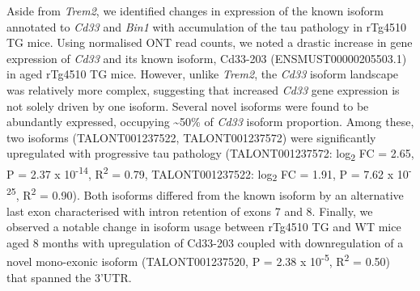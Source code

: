 Aside from \textit{Trem2}, we identified changes in expression of the known isoform annotated to \textit{Cd33} and \textit{Bin1} with accumulation of the tau pathology in rTg4510 TG mice. Using normalised ONT read counts, we noted a drastic increase in gene expression of \textit{Cd33} and its known isoform, Cd33-203 (ENSMUST00000205503.1) in aged rTg4510 TG mice. However, unlike \textit{Trem2}, the \textit{Cd33} isoform landscape was relatively more complex, suggesting that increased \textit{Cd33} gene expression is not solely driven by one isoform. Several novel isoforms were found to be abundantly expressed, occupying \textasciitilde50\% of \textit{Cd33} isoform proportion. Among these, two isoforms (TALONT001237522, TALONT001237572) were significantly upregulated with progressive tau pathology (TALONT001237572: log\textsubscript{2} FC = 2.65, P = 2.37 x 10\textsuperscript{-14}, R\textsuperscript{2} = 0.79, TALONT001237522: log\textsubscript{2} FC = 1.91, P = 7.62 x 10\textsuperscript{-25}, R\textsuperscript{2} = 0.90). Both isoforms differed from the known isoform by an alternative last exon characterised with intron retention of exons 7 and 8. Finally, we observed a notable change in isoform usage between rTg4510 TG and WT mice aged 8 months with upregulation of Cd33-203 coupled with downregulation of a novel mono-exonic isoform (TALONT001237520, P = 2.38 x 10\textsuperscript{-5}, R\textsuperscript{2} = 0.50) that spanned the 3'UTR. 

  

  


